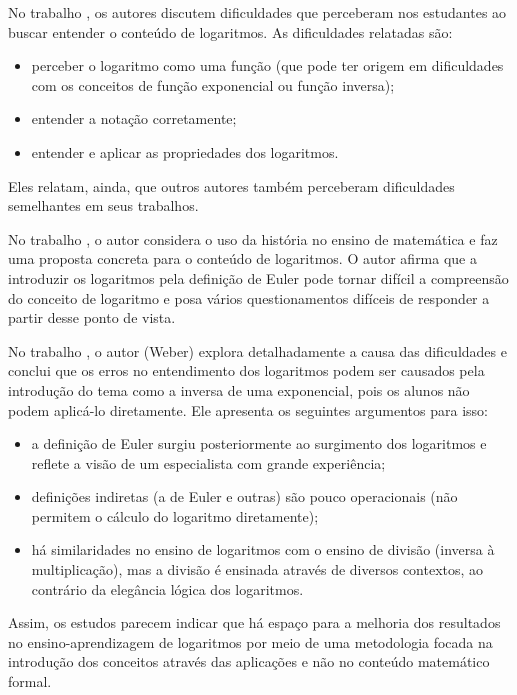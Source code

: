 \begin{apresentacao}
No trabalho \cite{Kenney2013}, os autores discutem dificuldades que perceberam nos estudantes ao buscar entender o conteúdo de logaritmos. As dificuldades relatadas são:
	\begin{itemize}
	\item perceber o logaritmo como uma função (que pode ter origem em dificuldades com os conceitos de função exponencial ou função inversa);
	\item entender a notação corretamente; 
	\item entender e aplicar as propriedades dos logaritmos.
	\end{itemize}
Eles relatam, ainda, que outros autores também perceberam dificuldades semelhantes em seus trabalhos.

No trabalho \cite{Panagiotou2011}, o autor considera o uso da história no ensino de matemática e faz uma proposta concreta para o conteúdo de logaritmos. O autor afirma que a introduzir os logaritmos pela definição de Euler pode tornar difícil a compreensão do conceito de logaritmo e posa vários questionamentos difíceis de responder a partir desse ponto de vista.

No trabalho \cite{Weber2016}, o autor (Weber) explora detalhadamente a causa das dificuldades e conclui que os erros no entendimento dos logaritmos podem ser causados pela introdução do tema como a inversa de uma exponencial, pois os alunos não podem aplicá-lo diretamente. Ele apresenta os seguintes argumentos para isso:
\begin{itemize}
\item a definição de Euler surgiu posteriormente ao surgimento dos logaritmos e reflete a visão de um especialista com grande experiência;
\item definições indiretas (a de Euler e outras) são pouco operacionais (não permitem o cálculo do logaritmo diretamente);
\item há similaridades no ensino de logaritmos com o ensino de divisão (inversa à multiplicação), mas a divisão é ensinada através de diversos contextos, ao contrário da elegância lógica dos logaritmos.
\end{itemize}
	
Assim, os estudos parecem indicar que há espaço para a melhoria dos resultados no ensino-aprendizagem de logaritmos por meio de uma metodologia focada na introdução dos conceitos através das aplicações e não no conteúdo matemático formal.


\end{apresentacao}
